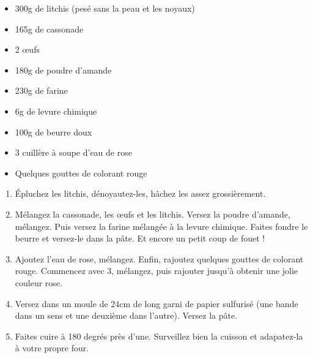 \bigskip
{}
{}{\begin{itemize}
	\item 300g de litchis (pesé sans la peau et les noyaux)
	\item 165g de cassonade
	\item 2 \oe ufs
	\item 180g de poudre d'amande
	\item 230g de farine
	\item 6g de levure chimique
	\item 100g de beurre doux
	\item 3 cuillère à soupe d'eau de rose
	\item Quelques gouttes de colorant rouge
\end{itemize}

\bigskip}
{\begin{enumerate}
	\item Épluchez les litchis, dénoyautez-les, hâchez les assez grossièrement.
	\item Mélangez la cassonade, les \oe ufs et les litchis. Versez la poudre d'amande, mélangez. Puis versez la farine mélangée à la levure chimique. Faites fondre le beurre et versez-le dans la pâte. Et encore un petit coup de fouet !
	\item Ajoutez l'eau de rose, mélangez. Enfin, rajoutez quelques gouttes de colorant rouge. Commencez avec 3, mélangez, puis rajouter jusqu'à obtenir une jolie couleur rose.
	\item Versez dans un moule de 24cm de long garni de papier sulfurisé (une bande dans un sens et une deuxième dans l'autre). Versez la pâte.
	\item Faites cuire à 180 degrés près d'une. Surveillez bien la cuisson et adapatez-la à votre propre four.
\end{enumerate}}

